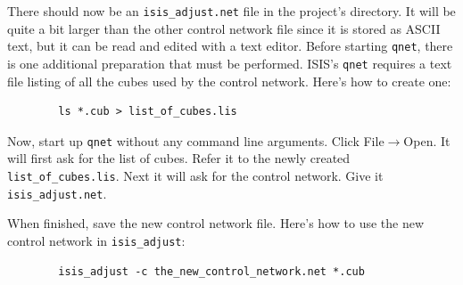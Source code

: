 There should now be an \verb=isis_adjust.net= file in the project's
directory. It will be quite a bit larger than the other control
network file since it is stored as ASCII text, but it can be read and
edited with a text editor. Before starting \texttt{qnet}, there is one
additional preparation that must be performed. ISIS's \texttt{qnet} requires
a text file listing of all the cubes used by the control
network. Here's how to create one:

\begin{verbatim}
        ls *.cub > list_of_cubes.lis
\end{verbatim}

Now, start up \texttt{qnet} without any command line arguments. Click
File$\rightarrow$Open. It will first ask for the list of cubes. Refer
it to the newly created \texttt{list\_of\_cubes.lis}. Next it will ask for
the control network. Give it \texttt{isis\_adjust.net}.

\begin{center}
\end{center}

When finished, save the new control network file. Here's how to use
the new control network in \texttt{isis\_adjust}:

\begin{verbatim}
        isis_adjust -c the_new_control_network.net *.cub
\end{verbatim}

% 
% 
